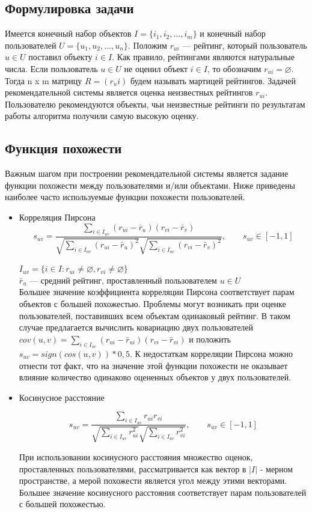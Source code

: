 \documentclass[a4paper, 12pt]{article} %
\begin{document}
\subsection{Формулировка задачи}
Имеется конечный набор объектов $I=\{i_{1}, i_{2}, \dots, i_{m}\}$ и конечный набор пользователей $U=\{u_{1}, u_{2}, \dots, u_{n}\}$.
Положим $r_{ui}$ --- рейтинг, который пользователь $u\in U$ поставил объекту $i\in I$. Как правило, рейтингами являются натуральные числа. Если пользователь $u \in U$ не оценил объект $i \in I$, то обозначим $r_{ui} = \varnothing$. Тогда n x m матрицу  $R = (r_ui) $ будем называть мартицей рейтингов. Задачей рекомендательной системы является оценка неизвестных рейтингов $r_{ui}$. Пользователю рекомендуются объекты, чьи неизвестные рейтинги по результатам работы алгоритма получили самую высокую оценку.


\subsection{Функция похожести}
Важным шагом при построении рекомендательной системы является задание функции похожести между пользователями и/или объектами. Ниже приведены наиболее часто используемые функции похожести пользователей.
\begin{itemize}

\item{Корреляция Пирсона\cite{grouplens}}
\[
s_{uv} = \frac{\sum_{i \in I_{uv}} (r_{ui} - \bar{r}_{u})(r_{vi} - \bar{r}_{v})}{\sqrt{\sum_{i \in I_{uv}}  (r_{ui} - \bar{r}_{u})^2} \sqrt{\sum_{i \in I_{uv}}  (r_{vi} - \bar{r}_{v})^2}},\qquad s_{uv} \in [-1, 1]
\]

$I_{uv} = \{i \in I: r_{ui} \neq  \varnothing, r_{vi} \neq \varnothing\}$ 
\\
$\bar{r}_{u}$ --- средний рейтинг, проставленный пользователем $u \in U$ 
\\ 
Большее значение коэффициента корреляции Пирсона соответствует парам объектов с большей похожестью. Проблемы могут возникать при оценке пользователей, поставивших всем объектам одинаковый рейтинг. В таком случае предлагается вычислить ковариацию двух пользователей\\ $cov(u, v) = \sum_{i \in I_{uv}} (r_{ui} - \bar{r}_{ui})(r_{vi} - \bar{r}_{vi})$ и положить $s_{uv}=sign(cos(u,v)) * 0,5$. К недостаткам корреляции Пирсона можно отнести тот факт, что на значение этой функции похожести не оказывает влияние количество одинаково оцененных объектов у двух пользователей.


\item{Косинусное расстояние}

\[
s_{uv} = \frac{\sum_{i \in I_{uv}} r_{ui}r_{vi}} {\sqrt{\sum_{i \in I_{uv}} r_{ui}^2} \sqrt{\sum_{i \in I_{uv}} r_{vi}^2}},\qquad s_{uv} \in [-1, 1] 
\]

При использовании косинусного расстояния множество оценок, проставленных пользователями, рассматривается как вектор в $|I|$ - мерном пространстве, а мерой похожести является угол между этими векторами. Большее значение косинусного расстояния соответствует парам пользователей с большей похожестью. 
\end{itemize}
\end{document}
